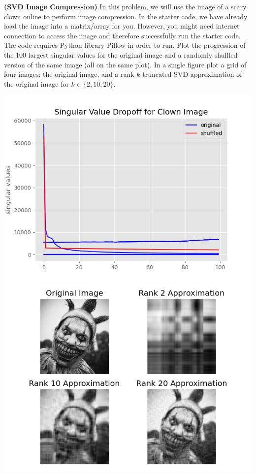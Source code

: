 \documentclass[12pt,letterpaper,fleqn]{hmcpset}
\begin{document}
\begin{problem}[2]
\textbf{(SVD Image Compression)}
In this problem, we will use the image of a scary clown online to perform image compression.  In the starter code, we have already load the image into a matrix/array for you. However, you might need internet connection to access the image and therefore successfully run the starter code. The code requires Python library Pillow in order to run.
\newline
\newline 
Plot the progression of the 100 largest singular values for the original image
and a randomly shuffled version of the same image (all on the same plot). In a single figure plot
a grid of four images: the original image, and a rank $k$ truncated SVD approximation of the original
image for $k\in\{2,10,20\}$.

\end{problem}
\begin{solution}
\begin{center}
	\includegraphics{dropoff.png}
	\includegraphics{reconstruction.png}
\end{center}
\end{solution}
\newpage
\end{document}
